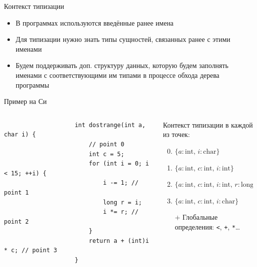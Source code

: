     \begin{frame}[fragile]{Контекст типизации}
        \begin{itemize}
            \item \pause В программах используются введённые ранее имена
            \item \pause Для типизации нужно знать типы сущностей, связанных ранее с этими именами
            \item \pause Будем поддерживать доп. структуру данных, которую будем заполнять именами с соответствующими им типами в процессе обхода дерева программы
        \end{itemize}
        \pause
        \begin{block}{Пример на Си}
            \vspace{-1em}
            \begin{columns}[onlytextwidth]
                \begin{column}{0.485\textwidth}
                    \begin{verbatim}
                    int dostrange(int a, char i) {
                        // point 0
                        int c = 5;
                        for (int i = 0; i < 15; ++i) {
                            i -= 1; // point 1
                            long r = i;
                            i *= r; // point 2
                        }
                        return a + (int)i * c; // point 3
                    }
                    \end{verbatim}
                \end{column}\hfill%
                \begin{column}{0.485\textwidth}
                    Контекст типизации в каждой из точек:
                    \begin{enumerate}
                        \setcounter{enumi}{-1}
                        \item $\{a : \mathrm{int},\, i : \mathrm{char}\}$
                        \item \pause $\{a : \mathrm{int},\, c : \mathrm{int},\, i : \mathrm{int}\}$
                        \item \pause $\{a : \mathrm{int},\, c : \mathrm{int},\, i : \mathrm{int},\, r : \mathrm{long}\}$
                        \item \pause $\{a : \mathrm{int},\, c : \mathrm{int},\, i : \mathrm{char}\}$
                        \item[$+$] \pause Глобальные определения: \pause \texttt{<}, \texttt{+}, \texttt{*}\ldots
                    \end{enumerate}
                \end{column}
            \end{columns}
        \end{block}
    \end{frame}

